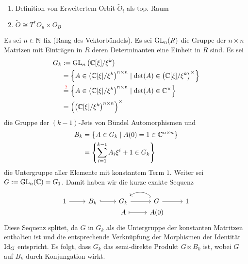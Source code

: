 \begin{ex}
\begin{enumerate}
\item
{} Definition von Erweitertem Orbit $\tilde O_i$ als top.
Raum
\item
{} $\tilde O\cong T^*O_u\times O_B$
\end{enumerate}
\end{ex}
Es sei $n\in\mathbb{N}$ fix (Rang des Vektorbündels).
Es sei $\operatorname{GL}_n(R)$ die Gruppe der $n\times n$ Matrizen mit Einträgen in $R$
deren Determinanten eine Einheit in $R$ sind.
Es sei
\begin{align*}
G_k&:=\operatorname{GL}_n\left(\mathbb{C}[\xi]/\xi^k\right)
\\&=\left\{A\in\left( \mathbb{C}[\xi]/\xi^k \right)^{n\times n}\mid
    \det(A)\in \left(\mathbb{C}[\xi]/\xi^k\right)^\times \right\}
\\&\overset{\text{\color{red}?}}=
    \left\{A\in\left( \mathbb{C}[\xi]/\xi^k \right)^{n\times n}\mid
    \det(A)\in \mathbb{C}^\times \right\}
\\&=\left(\left( \mathbb{C}[\xi]/\xi^k \right)^{n\times n}\right)^\times
\end{align*}
die Gruppe der $(k-1)$-Jets von Bündel Automorphismen und
\begin{align*}
B_k&=\left\{ A \in G_k \mid A(0)=1\in \mathbb{C}^{n\times n} \right\}
\\&=\left\{ \sum_{i=1}^{k-1}A_i\xi^i + 1 \in G_k \right\}
\end{align*}
die Untergruppe aller Elemente mit konstantem Term $1$.
Weiter sei $G:=\operatorname{GL}_n(\mathbb{C})=G_1$. Damit haben wir die kurze exakte Sequenz
\[
\begin{tikzcd}[row sep=0]
1 \rar & B_k \arrow[hook]{r} & G_k \rar & G \arrow[hook,bend right=40]{l}
  \rar & 1\\
& & A \arrow[|->]{r}& A(0)
\end{tikzcd}
\]
Diese Sequenz splitet, da $G$ in $G_k$ als die Untergruppe der konstanten
Matritzen enthalten ist und die entsprechende Verknüpfung der Morphismen der
Identität $\operatorname{Id}_G$ entspricht.
Es folgt, dass $G_k$ das semi-direkte Produkt $G\ltimes B_k$
ist, wobei $G$ auf $B_k$ durch Konjungation wirkt.
\begin{comment}
Die Kategorie der Gruppen ist nicht Abelsch, deshalb folgt nur der Zerfall in
ein semidirektes Produkt.\\
Siehe \cite[p.148]{hatcher2002algebraic}
\end{comment}
\begin{comment}
Es gilt $B_k\vartriangleleft G_k$, $G_k=B_kG$ und $G\cap B_k=\{1\}$,
deshalb ist $G_k=B_k\rtimes G$ bzw. $G_k=G\ltimes B_k$, wie es hier geschrieben
wird.
\begin{cor}
Aus $G_k=G\ltimes B_k$ folgt, dass $G_k\slash B_k\cong G$.
\end{cor}
\begin{lem}
Falls $G_k=G\ltimes B_k$ und $G_k=G\rtimes B_k$ so folgt, dass $G_k=G\times
B_k$
\end{lem}
\end{comment}


